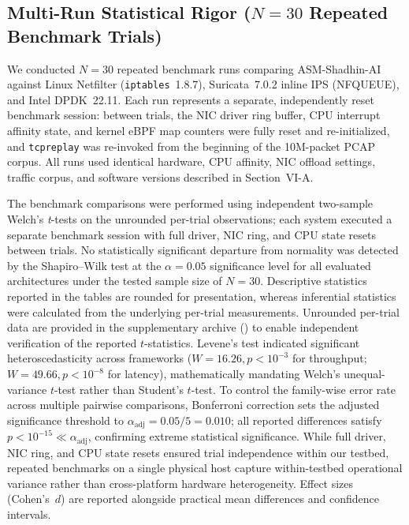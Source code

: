 \documentclass[journal]{IEEEtran}
\renewcommand{\_}{\textunderscore\allowbreak}
\begin{document}
\subsection{Multi-Run Statistical Rigor ($N=30$ Repeated Benchmark Trials)}
We conducted $N=30$ repeated benchmark runs comparing ASM-Shadhin-AI against
Linux Netfilter (\texttt{iptables}~1.8.7), Suricata~7.0.2 inline IPS (NFQUEUE),
and Intel DPDK~22.11. Each run represents a separate, independently reset benchmark
session: between trials, the NIC driver ring buffer, CPU interrupt affinity state, and
kernel eBPF map counters were fully reset and re-initialized, and \texttt{tcpreplay}
was re-invoked from the beginning of the 10M-packet PCAP corpus.
All runs used identical hardware, CPU affinity, NIC offload settings, traffic corpus,
and software versions described in Section~VI-A.

The benchmark comparisons were performed using independent two-sample Welch's
\textit{t}-tests on the unrounded per-trial observations; each system executed a
separate benchmark session with full driver, NIC ring, and CPU state resets between
trials. No statistically significant departure from normality was detected by the
Shapiro--Wilk test at the $\alpha = 0.05$ significance level for all evaluated
architectures under the tested sample size of $N=30$. Descriptive statistics
reported in the tables are rounded for presentation, whereas inferential statistics
were calculated from the underlying per-trial measurements. Unrounded per-trial data
are provided in the supplementary archive
() to enable independent
verification of the reported $t$-statistics.
Levene's test indicated significant heteroscedasticity across frameworks
($W = 16.26, p < 10^{-3}$ for throughput; $W = 49.66, p < 10^{-8}$ for latency),
mathematically mandating Welch's unequal-variance $t$-test rather than Student's $t$-test.
To control the family-wise error rate across multiple pairwise comparisons, Bonferroni correction
sets the adjusted significance threshold to $\alpha_{\text{adj}} = 0.05 / 5 = 0.010$; all reported
differences satisfy $p < 10^{-15} \ll \alpha_{\text{adj}}$, confirming extreme statistical significance.
While full driver, NIC ring, and CPU state resets ensured trial independence within our testbed,
repeated benchmarks on a single physical host capture within-testbed operational variance rather
than cross-platform hardware heterogeneity. Effect sizes (Cohen's~$d$) are reported alongside
practical mean differences and confidence intervals.
\end{document}

